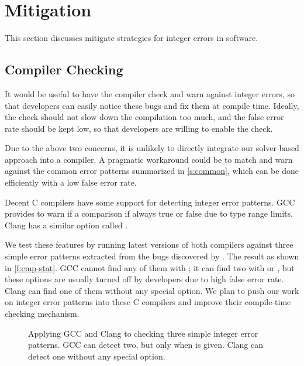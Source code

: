 \section{Mitigation}
\label{s:miti}

This section discusses mitigate strategies for integer errors in
software.

\subsection{Compiler Checking}

It would be useful to have the compiler check and warn against
integer errors, so that developers can easily notice these bugs and
fix them at compile time.  Ideally, the check should not slow down
the compilation too much, and the false error rate should be kept low,
so that developers are willing to enable the check.

Due to the above two concerns, it is unlikely to directly integrate
our solver-based approach into a compiler.  A pragmatic workaround
could be to match and warn against the common error patterns
summarized in \autoref{s:common}, which can be done efficiently
with a low false error rate.

Decent C compilers have some support for detecting integer error
patterns.
%
GCC provides  to warn if a comparison if always
true or false due to type range limits.
%
Clang has a similar option called .

We test these features by running latest versions of both compilers
against three simple error patterns extracted from the bugs discovered
by \sys.  The result as shown in \autoref{f:cmp-stat}.  GCC cannot
find any of them with ; it can find two with 
or , but these options are usually turned off by
developers due to high false error rate.  Clang can find one of them
without any special option.
%
%
We plan to push our work on integer error patterns into these C
compilers and improve their compile-time checking mechanism.

\begin{figure}
\centering

\caption{Applying GCC and Clang to checking three simple integer
error patterns.  GCC can detect two, but only when  is
given.  Clang can detect one without any special option.}
\label{f:cmp-stat}
\end{figure}

